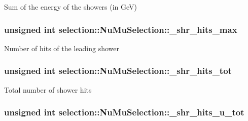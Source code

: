 Sum of the energy of the showers (in Ge\-V) \hypertarget{classselection_1_1NuMuSelection_ab314b2264e547d258e88d2f773352b9f}{
\subsubsection[{\-\_\-shr\-\_\-hits\-\_\-max}]{\setlength{\rightskip}{0pt plus 5cm}unsigned int selection\-::\-Nu\-Mu\-Selection\-::\-\_\-shr\-\_\-hits\-\_\-max\hspace{0.3cm}{\ttfamily [private]}}}\label{classselection_1_1NuMuSelection_ab314b2264e547d258e88d2f773352b9f}
Number of hits of the leading shower \hypertarget{classselection_1_1NuMuSelection_a9233cd2b1aa05f66da7c04f99ff99058}{
\subsubsection[{\-\_\-shr\-\_\-hits\-\_\-tot}]{\setlength{\rightskip}{0pt plus 5cm}unsigned int selection\-::\-Nu\-Mu\-Selection\-::\-\_\-shr\-\_\-hits\-\_\-tot\hspace{0.3cm}{\ttfamily [private]}}}\label{classselection_1_1NuMuSelection_a9233cd2b1aa05f66da7c04f99ff99058}
Total number of shower hits \hypertarget{classselection_1_1NuMuSelection_aa88c0578a68ec301fecbe3262aa44762}{
\subsubsection[{\-\_\-shr\-\_\-hits\-\_\-u\-\_\-tot}]{\setlength{\rightskip}{0pt plus 5cm}unsigned int selection\-::\-Nu\-Mu\-Selection\-::\-\_\-shr\-\_\-hits\-\_\-u\-\_\-tot\hspace{0.3cm}{\ttfamily [private]}}}\label{classselection_1_1NuMuSelection_aa88c0578a68ec301fecbe3262aa44762}
